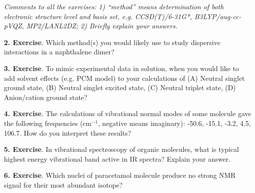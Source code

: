 \documentclass{homework}
\begin{document}
\textit{Comments to all the exercises: 1) ``method'' means determination of both electronic structure level and basis set, e.g. CCSD(T)/6-31G*, B3LYP/aug-cc-pVQZ, MP2/LANL2DZ; 2) Briefly explain your answers.}

\bigskip

\textbf{2. Exercise}. Which method(s) you would likely use to study dispersive interactions in a naphthalene dimer?

\bigskip

\textbf{3. Exercise}. To mimic experimental data in solution, when you would like to add solvent effects (e.g. PCM model) to your calculations of (A) Neutral singlet ground state, (B) Neutral singlet excited state, (C) Neutral triplet state, (D) Anion/cation ground state?

\bigskip

\textbf{4. Exercise}. The calculations of vibrational normal modes of some molecule gave the following frequencies (cm$^{-1}$, negative means imaginary): -50.6, -15.1, -3.2, 4.5, 106.7. How do you interpret these results?

\bigskip

\textbf{5. Exercise}. In vibrational spectroscopy of organic molecules, what is typical highest energy vibrational band active in IR spectra? Explain your answer.

\bigskip

\textbf{6. Exercise}. Which nuclei of paracetamol molecule produce no strong NMR signal for their most abundant isotope?
\end{document}
